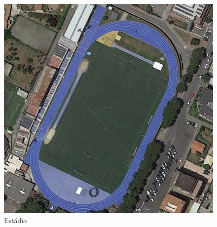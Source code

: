 \documentclass[conference]{IEEEtran}
\begin{document}
    \begin{figure}[!htb]
        \centering
        \includegraphics[width=0.5\linewidth]{Images/stadium_247.jpg}
        \caption{Estádio}
        \label{fig:estadio}
    \end{figure}
\end{document}
